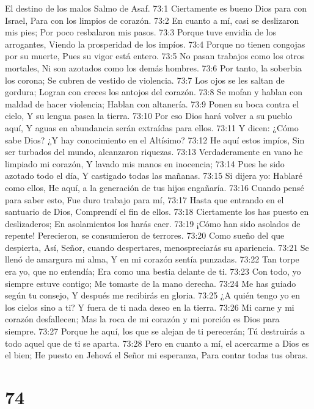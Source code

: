El destino de los malos 
Salmo de Asaf. 
73:1 Ciertamente es bueno Dios para con Israel, 
Para con los limpios de corazón. 
73:2 En cuanto a mí, casi se deslizaron mis pies; 
Por poco resbalaron mis pasos. 
73:3 Porque tuve envidia de los arrogantes, 
Viendo la prosperidad de los impíos. 
73:4 Porque no tienen congojas por su muerte, 
Pues su vigor está entero. 
73:5 No pasan trabajos como los otros mortales, 
Ni son azotados como los demás hombres. 
73:6 Por tanto, la soberbia los corona; 
Se cubren de vestido de violencia. 
73:7 Los ojos se les saltan de gordura; 
Logran con creces los antojos del corazón. 
73:8 Se mofan y hablan con maldad de hacer violencia; 
Hablan con altanería. 
73:9 Ponen su boca contra el cielo, 
Y su lengua pasea la tierra. 
73:10 Por eso Dios hará volver a su pueblo aquí, 
Y aguas en abundancia serán extraídas para ellos. 
73:11 Y dicen: ¿Cómo sabe Dios? 
¿Y hay conocimiento en el Altísimo? 
73:12 He aquí estos impíos, 
Sin ser turbados del mundo, alcanzaron riquezas. 
73:13 Verdaderamente en vano he limpiado mi corazón, 
Y lavado mis manos en inocencia; 
73:14 Pues he sido azotado todo el día, 
Y castigado todas las mañanas. 
73:15 Si dijera yo: Hablaré como ellos, 
He aquí, a la generación de tus hijos engañaría. 
73:16 Cuando pensé para saber esto, 
Fue duro trabajo para mí, 
73:17 Hasta que entrando en el santuario de Dios, 
Comprendí el fin de ellos. 
73:18 Ciertamente los has puesto en deslizaderos; 
En asolamientos los harás caer. 
73:19 ¡Cómo han sido asolados de repente! 
Perecieron, se consumieron de terrores. 
73:20 Como sueño del que despierta, 
Así, Señor, cuando despertares, menospreciarás su apariencia. 
73:21 Se llenó de amargura mi alma, 
Y en mi corazón sentía punzadas. 
73:22 Tan torpe era yo, que no entendía; 
Era como una bestia delante de ti. 
73:23 Con todo, yo siempre estuve contigo; 
Me tomaste de la mano derecha. 
73:24 Me has guiado según tu consejo, 
Y después me recibirás en gloria. 
73:25 ¿A quién tengo yo en los cielos sino a ti? 
Y fuera de ti nada deseo en la tierra. 
73:26 Mi carne y mi corazón desfallecen; 
Mas la roca de mi corazón y mi porción es Dios para siempre. 
73:27 Porque he aquí, los que se alejan de ti perecerán; 
Tú destruirás a todo aquel que de ti se aparta. 
73:28 Pero en cuanto a mí, el acercarme a Dios es el bien; 
He puesto en Jehová el Señor mi esperanza, 
Para contar todas tus obras. 

\chapter{74}

